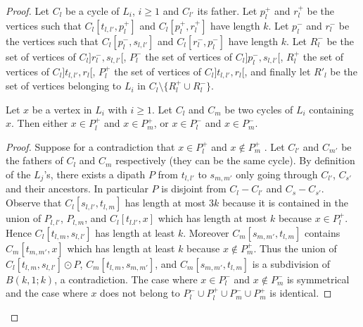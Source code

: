 \documentclass{endm}
\begin{document}
\begin{proof}
Let $C_l$ be a cycle of $L_i$, $i \geq 1$ and $C_{l'}$ its father. 
Let $p^+_l$ and $r^+_l$ be the vertices such that $C_l[t_{l,l'}, p^+_l]$ and $C_l[p^+_l,r^+_l]$  have length $k$. 
Let $p^-_l$ and $r^-_l$ be the vertices such that $C_l[p^-_l,s_{l,l'}]$ and $C_l[r^-_l,p^-_l]$ have length $k$.
Let $R^-_l$ be the set of vertices of $C_l]r^-_l, s_{l,l'}[$, $P^-_l$ the set of vertices of $C_l]p^-_l, s_{l,l'}[$,
$R^+_l$ the set of vertices of $C_l ]t_{l,l'}, r_l[$, $P^+_l$ the set of vertices of $C_l ]t_{l,l'}, r_l[$, and finally let 
$R'_l$ be the set of vertices belonging to $L_i$ in $C_l \setminus \{ R^+_l \cup R^-_l \}$. 



\begin{claim}\label{claim:Rpos}
Let $x$ be a vertex in $L_i$ with $i\geq 1$. Let $C_l$ and $C_m$ be two cycles of $L_i$ containing $x$.
Then either $x \in P^+_l$ and  $x \in  P^+_m$, or $x \in P^-_l$ and  $x \in  P^-_m$.
\end{claim}

\begin{proof}
Suppose for a contradiction that $x\in P^+_l$ and $x \not \in  P^+_m$  . %
Let $C_{l'}$ and $C_{m'}$ be the fathers of $C_l$ and $C_m$ respectively (they can be the same cycle). 
By definition of the $L_j$'s,  there exists a dipath $P$ from $t_{l,l'}$ to $s_{m,m'}$ only going through 
$C_{l'}$, $C_{s'}$ and their ancestors.
In particular $P$ is disjoint from $C_l - C_{l'}$ and  $C_s - C_{s'}$.
Observe that $C_l[s_{l,l'},t_{l,m}]$ has length at most $3k$ because it is contained in the union of $P_{l,l'}$, $P_{l,m}$, and $C_l[t_{l.l'}, x]$ which has length at most $k$ because $x\in P^+_l$. Hence  $C_l[t_{l,m},s_{l,l'}]$ has length at least $k$.
Moreover $C_m[s_{m,m'},t_{l,m}]$ contains  $C_m[t_{m,m'}, x]$ which has length at least $k$ because $x\notin P^+_m$.
Thus the union of $C_l[t_{l,m},s_{l,l'}] \odot P$, $C_m[t_{l,m},s_{m,m'}]$, 
and  $C_m[s_{m,m'},t_{l,m}]$ is a subdivision of $B(k,1;k)$, a contradiction.
The case where  $x\in P^-_l$ and $x \not \in  P^-_m$ is symmetrical and the case where $x$ does not belong to $P^-_l \cup P^+_l \cup P^-_m \cup P^+_m$ is identical.
\end{proof}




\end{proof}
\end{document}
